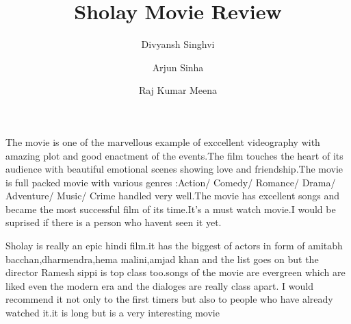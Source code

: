 \documentclass[]{article}
\title{Sholay Movie Review}
\author{Divyansh Singhvi
	\and
	Arjun Sinha
	\and
	Raj Kumar Meena}
\begin{document}
\maketitle
The movie is one of the marvellous example of exccellent videography with amazing plot and good enactment of the events.The film touches the heart of its audience with beautiful emotional scenes showing love and friendship.The movie is full packed movie with various genres :Action/ Comedy/ Romance/ Drama/ Adventure/ Music/ Crime  handled very well.The movie has excellent songs and became the most successful film of its time.It's a must watch movie.I would be suprised if there is a person who havent seen it yet.  


Sholay is really an epic hindi film.it has the biggest of actors in form of amitabh bacchan,dharmendra,hema malini,amjad khan and the list goes on but the director Ramesh sippi is top class too.songs of the movie are evergreen which are liked even the modern era and the dialoges are really class apart.
I would recommend it not only to the first timers but also to people who have already watched it.it is long but is a very interesting movie
\end{document}
